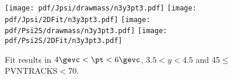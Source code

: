 \begin{figure}[H]
\begin{center}
\texttt{[image: pdf/Jpsi/drawmass/n3y3pt3.pdf]}
\texttt{[image: pdf/Jpsi/2DFit/n3y3pt3.pdf]}
\vspace*{-0.5cm}
\texttt{[image: pdf/Psi2S/drawmass/n3y3pt3.pdf]}
\texttt{[image: pdf/Psi2S/2DFit/n3y3pt3.pdf]}
\vspace*{-0.5cm}
\end{center}
\caption{Fit results in $4\gevc<\pt<6\gevc$, $3.5<y<4.5$ and 45$\leq$PVNTRACKS$<$70.}
\label{Fitn3y3pt3}
\end{figure}
